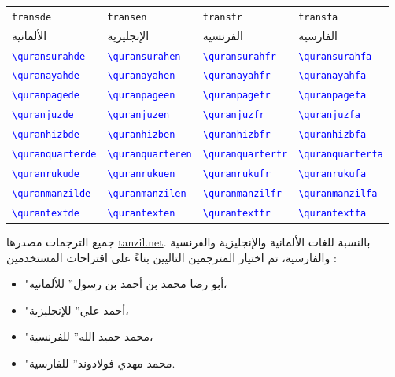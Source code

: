 \documentclass[12pt,a4paper]{article}
\newcommand{\cmd}[1]{\textenglish{\textcolor{blue}{\texttt{\textbackslash #1}}}}
\begin{document}
\begin{longtable}{|>{\centering\arraybackslash}p{3.5cm}|>{\centering\arraybackslash}p{3.5cm}|>{\centering\arraybackslash}p{3.5cm}|>{\centering\arraybackslash}p{3.5cm}|}
\hline
\texttt{transde} & \texttt{transen} & \texttt{transfr} & \texttt{transfa} \\
الألمانية & الإنجليزية & الفرنسية & الفارسية \\
\hline
\endfirsthead


\cmd{quransurahde}&
\cmd{quransurahen}&
\cmd{quransurahfr}&
\cmd{quransurahfa}
\\ \hline

\cmd{quranayahde}&
\cmd{quranayahen}&
\cmd{quranayahfr}&
\cmd{quranayahfa}
\\ \hline

\cmd{quranpagede} &
\cmd{quranpageen}&
\cmd{quranpagefr}&
\cmd{quranpagefa}
\\ \hline

\cmd{quranjuzde}&
\cmd{quranjuzen}&
\cmd{quranjuzfr}&
\cmd{quranjuzfa}
\\ \hline

\cmd{quranhizbde} &
\cmd{quranhizben} &
\cmd{quranhizbfr}&
\cmd{quranhizbfa}
\\ \hline

\cmd{quranquarterde} &
\cmd{quranquarteren} &
\cmd{quranquarterfr}&
\cmd{quranquarterfa}
\\ \hline

\cmd{quranrukude}&
\cmd{quranrukuen}&
\cmd{quranrukufr}&
\cmd{quranrukufa}
\\ \hline

\cmd{quranmanzilde} &
\cmd{quranmanzilen} &
\cmd{quranmanzilfr}&
\cmd{quranmanzilfa}
\\ \hline

\cmd{qurantextde}&
\cmd{qurantexten}&
\cmd{qurantextfr}&
\cmd{qurantextfa}
\\ \hline

\end{longtable}

جميع الترجمات مصدرها \url{tanzil.net}.
بالنسبة للغات الألمانية والإنجليزية والفرنسية والفارسية،
تم اختيار المترجمين التاليين بناءً على اقتراحات المستخدمين :
\begin{itemize}
\item "أبو رضا محمد بن أحمد بن رسول'' للألمانية،
\item "أحمد علي'' للإنجليزية،
\item "محمد حميد الله'' للفرنسية، 
\item "محمد مهدي فولادوند'' للفارسية.
\end{itemize}
\end{document}
